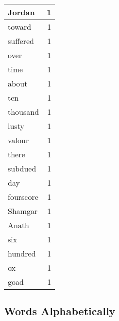 \begin{center}
\begin{longtable}{l|r}
Jordan & 1 \\ \hline
toward & 1 \\ \hline
suffered & 1 \\ \hline
over & 1 \\ \hline
time & 1 \\ \hline
about & 1 \\ \hline
ten & 1 \\ \hline
thousand & 1 \\ \hline
lusty & 1 \\ \hline
valour & 1 \\ \hline
there & 1 \\ \hline
subdued & 1 \\ \hline
day & 1 \\ \hline
fourscore & 1 \\ \hline
Shamgar & 1 \\ \hline
Anath & 1 \\ \hline
six & 1 \\ \hline
hundred & 1 \\ \hline
ox & 1 \\ \hline
goad & 1 \\ \hline
\end{longtable}
\end{center}



\normalsize



\subsection{Words Alphabetically}

